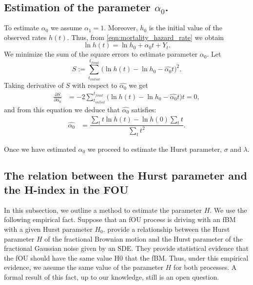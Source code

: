 \documentclass[smallextended]{svjour3}
\begin{document}
    \subsection{Estimation of the parameter $\alpha_0$.}
%
%
    To estimate
    $\alpha_0$ we assume $\alpha_1=1$. Moreover, $h_0$ is the initial 
    value of the observed rates $h(t)$. Thus, from 
    \eqref{eqn:mortality_hazard_rate} we obtain
    \begin{equation}
        \ln h(t)=
            \ln h_0 + \alpha_0 t + Y_t. \label{mod-ln}
    \end{equation}
    We minimize the sum of the square errors to estimate parameter $\alpha_0$.
    Let 
    \begin{equation*}
        S:= 
            \sum_{t_{initial}} ^ {t_{final}} 
                \Big( 
                    \ln h(t) 
                    - \ln h_0 
                    - \widehat{\alpha_0} t
                \Big)^2. 
    \end{equation*}
    Taking derivative of $S$ with respect to $\widehat{\alpha_0}$  we get
    \begin{align*}
        \frac{\partial S}{\partial \widehat{\alpha_0}}&=
            -2 \sum_{t_{initial}} ^ {t_{final}} 
            \Big( 
                \ln h(t)-\ln h_0-\widehat{\alpha_0} t
            \Big) t =0, %
    \end{align*}
    and from this equation we deduce that  $\widehat{\alpha_0}$ satisfies:
    \begin{align}
        \widehat{\alpha_0} 
            &= 
            \dfrac{
                \sum_{t} t 
                \ln h(t) 
                - 
                \ln h(0)
                \sum_{t} t
            }{
                \sum_{t} t^2
            }. \label{alpha0}
    \end{align}

    Once we have estimated $\alpha_0$ we proceed to estimate the Hurst 
    parameter, $\sigma$ and $\lambda$.

    \subsection{The relation between the Hurst 
        parameter and the H-index in the FOU}

        In this subsection, we outline a method to estimate the parameter $H$. 
    We use the following empirical fact. Suppose that an fOU process is driving 
    with an fBM with a given Hurst parameter $H_0$. 
    \citet{ye-etal}  provide a relationship between the Hurst parameter $H$ of 
    the fractional Brownian motion and the Hurst parameter of the fractional 
    Gaussian noise given by an SDE. They provide statistical evidence that the 
    fOU should have the same value H0 that the fBM. Thus, under this empirical 
    evidence, we assume the same value of the parameter $H$ for both 
    processes.  A formal result of this fact, up to our knowledge, still is an 
    open question.
\end{document}
